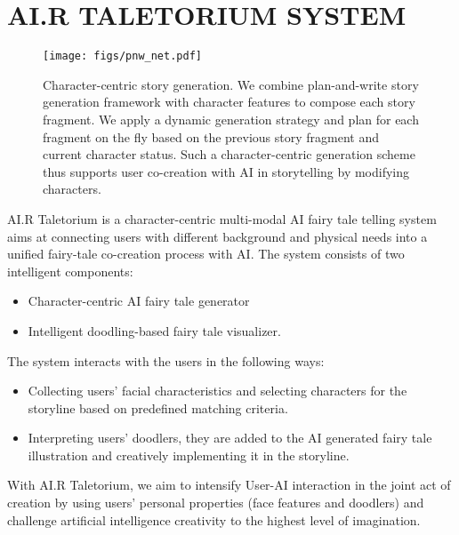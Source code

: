 
\section{AI.R TALETORIUM SYSTEM}

\begin{figure*}[t]
\begin{center}
   \texttt{[image: figs/pnw\_net.pdf]}
\end{center}
\caption{Character-centric story generation. We combine plan-and-write\cite{Yao} story generation framework with character features to compose each story fragment. We apply a dynamic generation strategy and plan for each fragment on the fly based on the previous story fragment and current character status. Such a character-centric generation scheme thus supports user co-creation with AI in storytelling by modifying characters.}
\label{fig:pnw_net}
\end{figure*}

AI.R Taletorium is a character-centric multi-modal AI fairy tale telling system aims at connecting users with different background and physical needs into a unified fairy-tale co-creation process with AI. The system consists of two intelligent components:
\begin{itemize}
    \item Character-centric AI fairy tale generator
    \item Intelligent doodling-based fairy tale visualizer. 
\end{itemize}
The system interacts with the users in the following ways:
\begin{itemize}
    \item Collecting users’ facial characteristics and selecting characters for the storyline based on predefined matching criteria.
    \item Interpreting users’ doodlers, they are added to the AI generated fairy tale illustration and creatively implementing it in the storyline.
\end{itemize}

With AI.R Taletorium, we aim to intensify User-AI interaction in the joint act of creation by using users’ personal properties (face features and doodlers) and challenge artificial intelligence creativity to the highest level of imagination.


